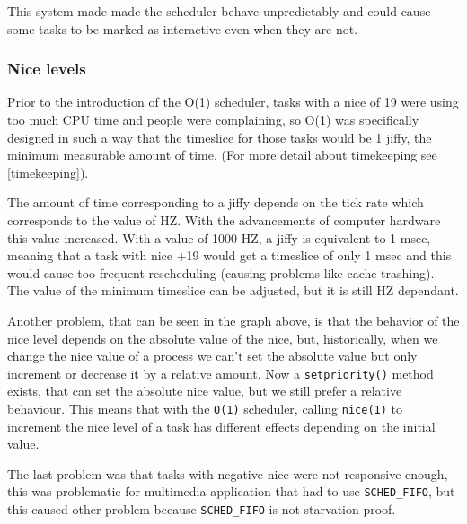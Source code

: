 \documentclass[10pt]{book}
\begin{document}
This system made made the scheduler behave unpredictably and could cause some tasks to be marked as interactive even when they are not.

\subsubsection{Nice levels}%
Prior to the introduction of the O(1) scheduler, tasks with a nice of 19 were using too much CPU time and people were complaining, so O(1) was specifically designed in such a way that the timeslice for those tasks would be 1 jiffy, the minimum measurable amount of time. (For more detail about timekeeping see \ref{timekeeping}).


The amount of time corresponding to a jiffy depends on the tick rate which corresponds to the value of HZ. With the advancements of computer hardware this value increased. With a value of 1000 HZ, a jiffy is equivalent to 1 msec, meaning that a task with nice +19 would get a timeslice of only  1 msec and this would cause too frequent rescheduling (causing problems like cache trashing). The value of the minimum timeslice can be adjusted, but it is still HZ dependant.

Another problem, that can be seen in the graph above, is that the behavior of the nice level depends on the absolute value of the nice, but, historically, when we change the nice value of a process we can't set the absolute value but only increment or decrease it by a relative amount. Now a \verb|setpriority()| method exists, that can set the absolute nice value, but we still prefer a relative behaviour. This means that with the \verb|O(1)| scheduler, calling \verb|nice(1)| to increment the nice level of a task has different effects depending on the initial value.

The last problem was that tasks with negative nice were not responsive enough, this was problematic for multimedia application that had to use \verb|SCHED_FIFO|, but this caused other problem because \verb|SCHED_FIFO| is not starvation proof.
\end{document}
